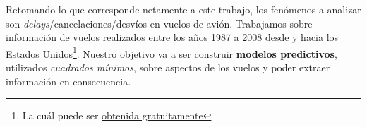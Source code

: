 Retomando lo que corresponde netamente a este trabajo, los fen\'omenos a analizar son \textit{delays}/cancelaciones/desv\'ios en vuelos de avi\'on. Trabajamos sobre informaci\'on de vuelos realizados entre los a\~nos 1987 a 2008 desde y hacia los Estados Unidos\footnote{La cu\'al puede ser \href{http://stat-computing.org/dataexpo/2009/the-data.html}{obtenida gratuitamente}}. Nuestro objetivo va a ser construir \textbf{modelos predictivos}, utilizados \textit{cuadrados m\'inimos}, sobre aspectos de los vuelos y poder extraer informaci\'on en consecuencia.

